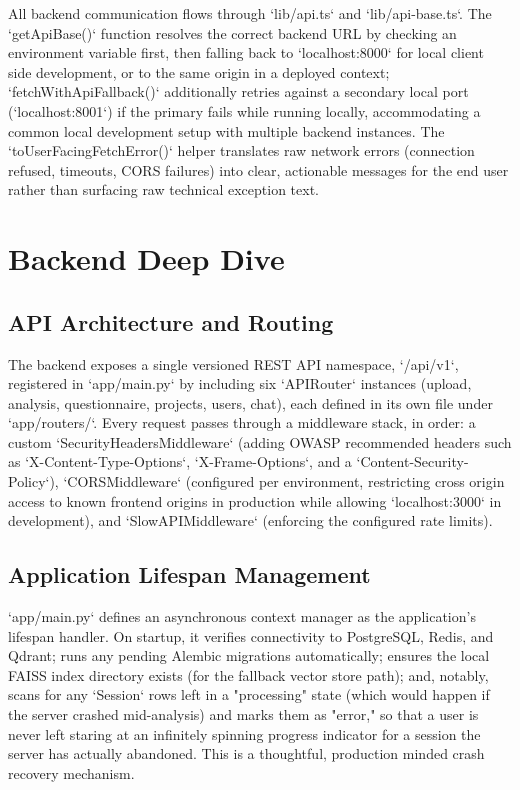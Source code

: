 \documentclass[11pt,a4paper]{report}
\begin{document}
All backend communication flows through `lib/api.ts` and `lib/api-base.ts`. The `getApiBase()` function resolves the correct backend URL by checking an environment variable first, then falling back to `localhost:8000` for local client side development, or to the same origin in a deployed context; `fetchWithApiFallback()` additionally retries against a secondary local port (`localhost:8001`) if the primary fails while running locally, accommodating a common local development setup with multiple backend instances. The `toUserFacingFetchError()` helper translates raw network errors (connection refused, timeouts, CORS failures) into clear, actionable messages for the end user rather than surfacing raw technical exception text.

\chapter{Backend Deep Dive}

\section{API Architecture and Routing}

The backend exposes a single versioned REST API namespace, `/api/v1`, registered in `app/main.py` by including six `APIRouter` instances (upload, analysis, questionnaire, projects, users, chat), each defined in its own file under `app/routers/`. Every request passes through a middleware stack, in order: a custom `SecurityHeadersMiddleware` (adding OWASP recommended headers such as `X-Content-Type-Options`, `X-Frame-Options`, and a `Content-Security-Policy`), `CORSMiddleware` (configured per environment, restricting cross origin access to known frontend origins in production while allowing `localhost:3000` in development), and `SlowAPIMiddleware` (enforcing the configured rate limits).

\section{Application Lifespan Management}

`app/main.py` defines an asynchronous context manager as the application's lifespan handler. On startup, it verifies connectivity to PostgreSQL, Redis, and Qdrant; runs any pending Alembic migrations automatically; ensures the local FAISS index directory exists (for the fallback vector store path); and, notably, scans for any `Session` rows left in a "processing" state (which would happen if the server crashed mid-analysis) and marks them as "error," so that a user is never left staring at an infinitely spinning progress indicator for a session the server has actually abandoned. This is a thoughtful, production minded crash recovery mechanism.
\end{document}
